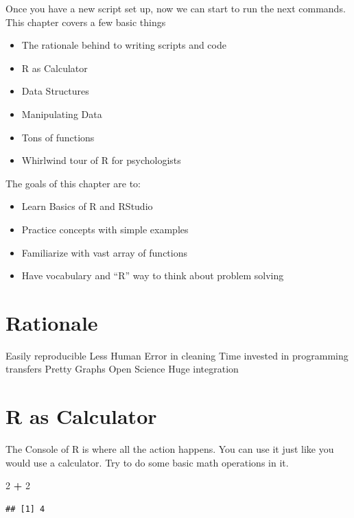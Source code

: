 \documentclass[]{book}
\newenvironment{Shaded}{\begin{snugshade}}{\end{snugshade}}
\newcommand{\DecValTok}[1]{\textcolor[rgb]{0.00,0.00,0.81}{#1}}
\newcommand{\StringTok}[1]{\textcolor[rgb]{0.31,0.60,0.02}{#1}}
\newcommand{\OperatorTok}[1]{\textcolor[rgb]{0.81,0.36,0.00}{\textbf{#1}}}
\providecommand{\tightlist}{%
  \setlength{\itemsep}{0pt}\setlength{\parskip}{0pt}}
\theoremstyle{definition}
\theoremstyle{definition}
\theoremstyle{definition}
\theoremstyle{remark}
\begin{document}
Once you have a new script set up, now we can start to run the next
commands. This chapter covers a few basic things

\begin{itemize}
\tightlist
\item
  The rationale behind to writing scripts and code
\item
  R as Calculator
\item
  Data Structures
\item
  Manipulating Data
\item
  Tons of functions
\item
  Whirlwind tour of R for psychologists
\end{itemize}

The goals of this chapter are to:

\begin{itemize}
\tightlist
\item
  Learn Basics of R and RStudio
\item
  Practice concepts with simple examples
\item
  Familiarize with vast array of functions
\item
  Have vocabulary and ``R'' way to think about problem solving
\end{itemize}

\section{Rationale}\label{rationale}

Easily reproducible Less Human Error in cleaning Time invested in
programming transfers Pretty Graphs Open Science Huge integration

\section{R as Calculator}\label{r-as-calculator}

The Console of R is where all the action happens. You can use it just
like you would use a calculator. Try to do some basic math operations in
it.

\begin{Shaded}
\begin{Highlighting}[]
\DecValTok{2} \OperatorTok{+}\StringTok{ }\DecValTok{2}
\end{Highlighting}
\end{Shaded}

\begin{verbatim}
## [1] 4
\end{verbatim}
\end{document}
